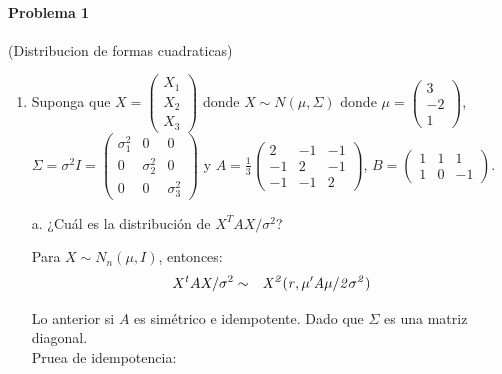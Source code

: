 \documentclass[12pt,a4paper]{report}
\author{Guadalupe Monroy}
\begin{document}


\paragraph{Problema 1} (Distribucion de formas cuadraticas)

\begin{enumerate}
			
		\item Suponga que $X = \begin{pmatrix} X_1 \\ X_2 \\ X_3 \end{pmatrix}$ donde $X \sim N(\mu, \Sigma)$ donde $\mu = \begin{pmatrix} 3 \\ -2 \\ 1 \end{pmatrix}$, $\Sigma = \sigma^2 I = \begin{pmatrix} \sigma^2_{1} & 0 & 0 \\ 0 & \sigma^2_{2} & 0 \\ 0 & 0 & \sigma^2_{3} \end{pmatrix}$ y
			$A = \frac{1}{3} \begin{pmatrix} 2 & -1 & -1 \\ -1 & 2 & -1 \\ -1 & -1 & 2 \end{pmatrix}$, $B = \begin{pmatrix} 1 & 1 & 1 \\ 1 & 0 & -1 \end{pmatrix}$.

a. ¿Cuál es la distribución de $X^TAX/\sigma^2$?
			
Para $X\sim N_{n}(\mu, I)$, entonces:
		\begin{eqnarray*}
			X^{t}AX/\sigma^{2}&\sim& \it{X^{2}}(r,\mu'A\mu/2\sigma^{2})
		\end{eqnarray*}

Lo anterior si $A$ es simétrico e idempotente. Dado que $\Sigma$ es una matriz diagonal. \\
Pruea de idempotencia:\\ 
		

\end{enumerate}
\end{document}
